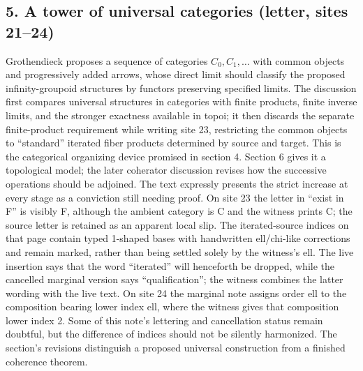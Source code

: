 \documentclass[10pt,oneside]{book}
\begin{document}
\subsection*{5. A tower of universal categories (letter, sites 21--24)}
Grothendieck proposes a sequence of categories $C_0,C_1,\ldots$ with common objects and progressively added arrows, whose direct limit should classify the proposed infinity-groupoid structures by functors preserving specified limits. The discussion first compares universal structures in categories with finite products, finite inverse limits, and the stronger exactness available in topoi; it then discards the separate finite-product requirement while writing site 23, restricting the common objects to ``standard'' iterated fiber products determined by source and target. This is the categorical organizing device promised in section 4. Section 6 gives it a topological model; the later coherator discussion revises how the successive operations should be adjoined. The text expressly presents the strict increase at every stage as a conviction still needing proof. On site 23 the letter in ``exist in F'' is visibly F, although the ambient category is C and the witness prints C; the source letter is retained as an apparent local slip. The iterated-source indices on that page contain typed 1-shaped bases with handwritten ell/chi-like corrections and remain marked, rather than being settled solely by the witness's ell. The live insertion says that the word ``iterated'' will henceforth be dropped, while the cancelled marginal version says ``qualification''; the witness combines the latter wording with the live text. On site 24 the marginal note assigns order ell to the composition bearing lower index ell, where the witness gives that composition lower index 2. Some of this note's lettering and cancellation status remain doubtful, but the difference of indices should not be silently harmonized. The section's revisions distinguish a proposed universal construction from a finished coherence theorem.
\end{document}

